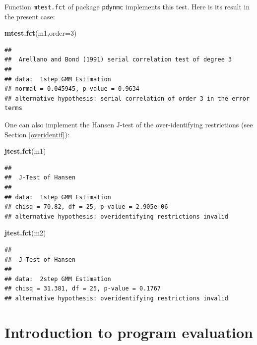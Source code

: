\documentclass[
  12pt,
]{book}
\newenvironment{Shaded}{\begin{snugshade}}{\end{snugshade}}
\newcommand{\AttributeTok}[1]{\textcolor[rgb]{0.13,0.29,0.53}{#1}}
\newcommand{\DecValTok}[1]{\textcolor[rgb]{0.00,0.00,0.81}{#1}}
\newcommand{\FunctionTok}[1]{\textcolor[rgb]{0.13,0.29,0.53}{\textbf{#1}}}
\newcommand{\NormalTok}[1]{#1}
\theoremstyle{definition}
\theoremstyle{definition}
\theoremstyle{definition}
\theoremstyle{definition}
\theoremstyle{remark}
\begin{document}
Function \texttt{mtest.fct} of package \texttt{pdynmc} implements this test. Here is its result in the present case:

\begin{Shaded}
\begin{Highlighting}[]
\FunctionTok{mtest.fct}\NormalTok{(m1,}\AttributeTok{order=}\DecValTok{3}\NormalTok{)}
\end{Highlighting}
\end{Shaded}

\begin{verbatim}
## 
##  Arellano and Bond (1991) serial correlation test of degree 3
## 
## data:  1step GMM Estimation
## normal = 0.045945, p-value = 0.9634
## alternative hypothesis: serial correlation of order 3 in the error terms
\end{verbatim}

One can also implement the Hansen J-test of the over-identifying restrictions (see Section \ref{overidentif}):

\begin{Shaded}
\begin{Highlighting}[]
\FunctionTok{jtest.fct}\NormalTok{(m1)}
\end{Highlighting}
\end{Shaded}

\begin{verbatim}
## 
##  J-Test of Hansen
## 
## data:  1step GMM Estimation
## chisq = 70.82, df = 25, p-value = 2.905e-06
## alternative hypothesis: overidentifying restrictions invalid
\end{verbatim}

\begin{Shaded}
\begin{Highlighting}[]
\FunctionTok{jtest.fct}\NormalTok{(m2)}
\end{Highlighting}
\end{Shaded}

\begin{verbatim}
## 
##  J-Test of Hansen
## 
## data:  2step GMM Estimation
## chisq = 31.381, df = 25, p-value = 0.1767
## alternative hypothesis: overidentifying restrictions invalid
\end{verbatim}

\hypertarget{introduction-to-program-evaluation}{%
\section{Introduction to program evaluation}\label{introduction-to-program-evaluation}}
\end{document}
